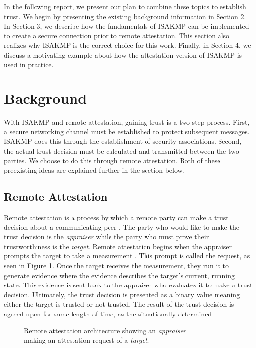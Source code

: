 \documentclass[12pt, letterpaper, twoside]{article}
\begin{document}
In the following report, we present our plan to combine these topics to establish trust. We begin by presenting the existing background information in Section 2. In Section 3, we describe how the fundamentals of ISAKMP can be implemented to create a secure connection prior to remote attestation. This section also realizes why ISAKMP is the correct choice for this work. Finally, in Section 4, we discuss a motivating example about how the attestation version of ISAKMP is used in practice. 

\section{Background}

With ISAKMP and remote attestation, gaining trust is a two step process. First, a secure networking channel must be established to protect subsequent messages. ISAKMP does this through the establishment of security associations. Second, the actual trust decision must be calculated and transmitted between the two parties. We choose to do this through remote attestation. Both of these preexisting ideas are explained further in the section below. 

\subsection{Remote Attestation}

Remote attestation is a process by which a remote party can make a trust decision about a communicating peer \cite{prin_remote}. The party who would like to make the trust decision is the \emph{appraiser} while the party who must prove their trustworthiness is the \emph{target}. Remote attestation begins when the appraiser prompts the target to take a measurement \cite{copland, orchestrating_layered}. This prompt is called the request, as seen in Figure \ref{fig:architecture-fig}. Once the target receives the measurement, they run it to generate evidence where the evidence describes the target's current, running state. This evidence is sent back to the appraiser who evaluates it to make a trust decision. Ultimately, the trust decision is presented as a binary value meaning either the target is trusted or not trusted. The result of the trust decision is agreed upon for some length of time, as the situationally determined.  

\begin{figure}[hbtp]
  \centering 
  \captionsetup{justification=centering}
  
  \caption[Attestation architecture]{Remote attestation architecture showing an \emph{appraiser} \\ making an attestation request of a \emph{target}.}
  \label{fig:architecture-fig}
\end{figure}
\end{document}
